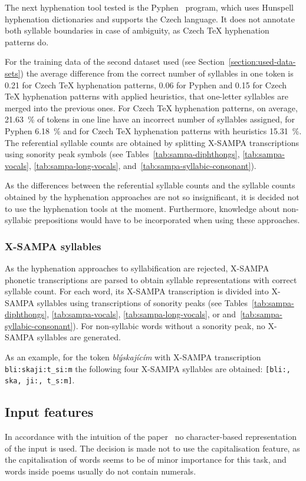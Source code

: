 The next hyphenation tool tested is the Pyphen~\cite{Pyphen} program, which uses Hunspell hyphenation dictionaries and supports the Czech language. It does not annotate both syllable boundaries in case of ambiguity, as Czech \TeX{} hyphenation patterns do.

For the training data of the second dataset used (see Section~\ref{section:used-data-sets}) the average difference from the correct number of syllables in one token is 0.21 for Czech \TeX{} hyphenation patterns, 0.06 for Pyphen and 0.15 for Czech \TeX{} hyphenation patterns with applied heuristics, that one-letter syllables are merged into the previous ones. For Czech \TeX{} hyphenation patterns, on average, 21.63~\% of tokens in one line have an incorrect number of syllables assigned, for Pyphen 6.18~\% and for Czech \TeX{} hyphenation patterns with heuristics 15.31~\%. The referential syllable counts are obtained by splitting X-SAMPA transcriptions using sonority peak symbols (see Tables~\ref{tab:sampa-diphthongs}, \ref{tab:sampa-vocals}, \ref{tab:sampa-long-vocals}, and~\ref{tab:sampa-syllabic-consonant}).

As the differences between the referential syllable counts and the syllable counts obtained by the hyphenation approaches are not so insignificant, it is decided not to use the hyphenation tools at the moment. Furthermore, knowledge about non-syllabic prepositions would have to be incorporated when using these approaches.

\subsubsection{X-SAMPA syllables}
As the hyphenation approaches to syllabification are rejected, X-SAMPA phonetic transcriptions are parsed to obtain syllable representations with correct syllable count. For each word, its X-SAMPA transcription is divided into X-SAMPA syllables using transcriptions of sonority peaks (see Tables~\ref{tab:sampa-diphthongs}, \ref{tab:sampa-vocals}, \ref{tab:sampa-long-vocals}, or and~\ref{tab:sampa-syllabic-consonant}). For non-syllabic words without a sonority peak, no X-SAMPA syllables are generated.

As an example, for the token \emph{blýskajícím} with X-SAMPA transcription \verb|bli:skaji:t_si:m| the following four X-SAMPA syllables are obtained: \verb|[bli:, ska, ji:, t_s:m]|.

\subsection{Input features}
In accordance with the intuition of the paper~\cite{MetricalTaggingInTheWild} no character-based representation of the input is used. The decision is made not to use the capitalisation feature, as the capitalisation of words seems to be of minor importance for this task, and words inside poems usually do not contain numerals.

